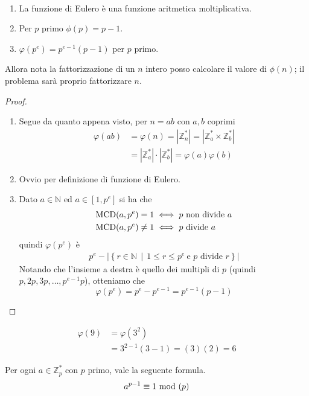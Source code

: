 \begin{proposizione}\
	\begin{enumerate}
		\item La funzione di Eulero è una funzione aritmetica moltiplicativa.
		\item Per $p$ primo $\phi(p)=p-1$.
		\item $\varphi(p^e)=p^{e-1}(p-1)$ per $p$ primo.
	\end{enumerate}
	Allora nota la fattorizzazione di un $n$ intero posso calcolare il valore di $\phi(n)$; il problema sarà proprio fattorizzare $n$.
\end{proposizione}
\begin{proof}\
	\begin{enumerate}
		\item Segue da quanto appena visto, per $n=ab$ con $a,b$ coprimi
		\begin{align*}
		\varphi(ab)&=\varphi(n)=|\mathbb{Z}_n^*|=|\mathbb{Z}_a^*\times\mathbb{Z}_b^*|\\
		&=|\mathbb{Z}_a^*|\cdot|\mathbb{Z}_b^*|=\varphi(a)\varphi(b)
		\end{align*}
		\item Ovvio per definizione di funzione di Eulero.
		\item Dato $a\in\mathbb{N}$ ed $a\in[1,p^e]$ si ha che
		\begin{align*}
		\operatorname{\mathrm{MCD}}(a,p^e)=1&\iff \text{$p$ non divide $a$}\\
		\operatorname{\mathrm{MCD}}(a,p^e)\neq1&\iff \text{$p$ divide $a$}
		\end{align*}
		quindi $\varphi(p^e)$ è
		\begin{align*}
		p^e-\left|\left\{r\in\mathbb{N} \, \mid \, 1\leq r\leq p^e \ \text{e $p$ divide $r$}\right\}\right|
		\end{align*}
		Notando che l'insieme a destra è quello dei multipli di $p$ (quindi $p,2p,3p,\dots,p^{e-1}p$), otteniamo che 
		\begin{equation*}
		\varphi(p^e)=p^e-p^{e-1}=p^{e-1}(p-1)
		\end{equation*}
	\end{enumerate}
\end{proof}
\begin{esempio}
	\begin{align*}
	\varphi(9)
	&=\varphi(3^2)\\
	&=3^{2-1}(3-1)=(3)(2)=6
	\end{align*}
\end{esempio}
\begin{teorema}
	Per ogni $a\in\mathbb{Z}_p^*$ con $p$ primo, vale la seguente formula.
	\begin{equation*}
	a^{p-1}\equiv1\ \mathrm{mod}\ (p)
	\end{equation*}
\end{teorema}
